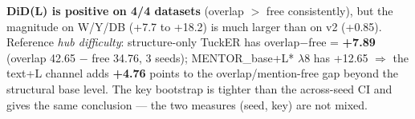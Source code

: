 \begin{table}[t]
\vspace{2pt}
\begin{minipage}{\linewidth}\footnotesize\raggedright
\textbf{DiD(L) is positive on 4/4 datasets} (overlap $>$ free consistently), but the magnitude on W/Y/DB (+7.7 to +18.2)
is much larger than on v2 (+0.85). Reference \emph{hub difficulty}: structure-only TuckER has overlap$-$free = \textbf{+7.89}
(overlap 42.65 $-$ free 34.76, 3 seeds); MENTOR\_base+L* $\lambda$8 has +12.65 $\Rightarrow$ the text+L channel adds
\textbf{+4.76} points to the overlap/mention-free gap beyond the structural base level. The key bootstrap is
tighter than the across-seed CI and gives the same conclusion --- the two measures (seed, key) are not mixed.
\end{minipage}
\end{table}
